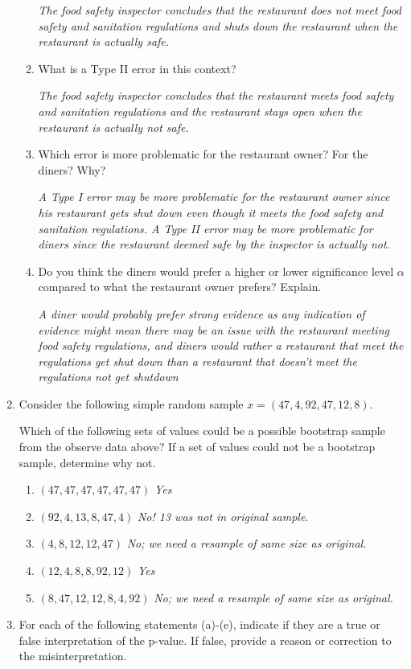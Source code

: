 \documentclass[12pt]{article}   	%
\newcommand{\soln}[2]{\textit{\textcolor{custom_red}{#2}}}{}
\begin{document}
\begin{enumerate}
\begin{enumerate}
     \soln{}{The food safety inspector concludes that the restaurant does not meet food safety
and sanitation regulations and shuts down the restaurant when the restaurant is
actually safe.}
  \item
    What is a Type II error in this context?
    
    \soln{}{The food safety inspector concludes that the restaurant meets food safety and sanitation regulations and the restaurant stays open when the restaurant is actually
not safe.}
  \item
    Which error is more problematic for the restaurant owner? For the
    diners? Why?
    
    \soln{}{A Type I error may be more problematic for the restaurant owner since his restaurant gets shut down even though it meets the food safety and sanitation regulations. A Type II error may be more problematic for diners since the restaurant deemed
safe by the inspector is actually not.}
  \item
    Do you think the diners would prefer a higher or lower significance
    level \(\alpha\) compared to what the restaurant owner prefers? 
    Explain.
    
    \soln{}{A diner would probably prefer strong evidence as any indication of evidence might mean there
may be an issue with the restaurant meeting food safety regulations,
and diners would rather a restaurant that meet the regulations get shut down than a
restaurant that doesn’t meet the regulations not get shutdown}
  \end{enumerate}
\item
  Consider the following simple random sample
  \(x = (47, 4, 92, 47, 12, 8)\).

  Which of the following sets of values could be a possible bootstrap
  sample from the observe data above? If a set of values could not be a
  bootstrap sample, determine why not.

  \begin{enumerate}
  \item
    \((47, 47, 47, 47, 47, 47)\) \soln{}{Yes}
  \item
    \((92, 4, 13,8, 47, 4)\) \soln{}{No! 13 was not in original sample.}
  \item
    \((4, 8, 12, 12, 47)\) \soln{}{No; we need a resample of same size as original.}
  \item
    \((12, 4, 8, 8, 92, 12)\) \soln{}{Yes}
  \item
    \((8, 47, 12, 12, 8, 4, 92)\) \soln{}{No; we need a resample of same size as original.}
  \end{enumerate}
\item
  For each of the following statements (a)-(e), indicate if they are a
  true or false interpretation of the p-value. If false, provide a
  reason or correction to the misinterpretation.


\end{enumerate}
\end{document}
